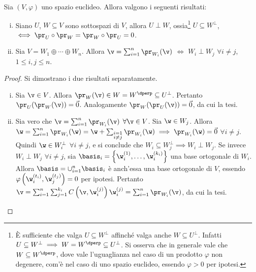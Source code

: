 \begin{proposition}
	Sia $(V, \varphi)$ uno spazio euclideo. Allora valgono i seguenti risultati:
	
	\begin{enumerate}[(i)]
		\item Siano $U$, $W \subseteq V$ sono sottospazi di $V$, allora $U \perp W$, ossia\footnote{È sufficiente che valga $U \subseteq W^\perp$ affinché valga anche $W \subseteq U^\perp$. Infatti $U \subseteq W^\perp \implies W = W^\dperp \subseteq U^\perp$. Si osserva che in generale vale che $W \subseteq W^\dperp$, dove vale l'uguaglianza nel caso di un prodotto $\varphi$ non degenere, com'è nel caso di uno spazio euclideo,
			essendo $\varphi > 0$ per ipotesi.} $U \subseteq W^\perp$, $\iff \pr_U \circ \pr_W = \pr_W \circ \pr_U = 0$.
		
		\item Sia $V = W_1 \oplus \cdots \oplus W_n$. Allora $\v = \sum_{i=1}^n \pr_{W_i}(\v)$ $\iff$ $W_i \perp W_j$ $\forall i \neq j$, $1 \leq i, j \leq n$.
	\end{enumerate}
\end{proposition}

\begin{proof}
	Si dimostrano i due risultati separatamente.
	
	\begin{enumerate}[(i)]
		\item Sia $\v \in V$. Allora $\pr_W(\v) \in W = W^\dperp \subseteq U^\perp$. Pertanto
		$\pr_U(\pr_W(\v)) = \vec 0$. Analogamente $\pr_W(\pr_U(\v)) = \vec 0$, da cui la tesi.
		
		\item Sia vero che $\v = \sum_{i=1}^n \pr_{W_i}(\v)$ $\forall \v \in V$. Sia $\w \in W_j$. Allora $\w = \sum_{i=1}^n \pr_{W_i}(\w) = \w + \sum_{\substack{i=1 \\ i \neq j}} \pr_{W_i}(\w) \implies \pr_{W_i}(\w) = \vec 0$ $\forall i \neq j$. Quindi $\w \in W_i^\perp$ $\forall i \neq j$, e si conclude che $W_i \subseteq W_j^\perp
		\implies W_i \perp W_j$. Se invece $W_i \perp W_j$ $\forall i \neq j$, sia $\basis_i = \left\{ \w_i^{(1)}, \ldots, \w_i^{(k_i)} \right\}$ una base ortogonale di $W_i$. Allora $\basis = \cup_{i=1}^n \basis_i$ è anch'essa
		una base ortogonale di $V$, essendo $\varphi\left(\w_i^{(t_i)}, \w_j^{(t_j)}\right) = 0$ per ipotesi.
		Pertanto $\v = \sum_{i=1}^n \sum_{j=1}^{k_i} C\left(\v, \w_i^{(j)}\right)  \w_i^{(j)} = \sum_{i=1}^n \pr_{W_i}(\v)$,
		da cui la tesi. \qedhere
	\end{enumerate}
\end{proof}


